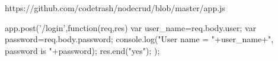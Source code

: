 https://github.com/codetrash/nodecrud/blob/master/app.js

app.post('/login',function(req,res){
  var user_name=req.body.user;
  var password=req.body.password;
  console.log("User name = "+user_name+", password is "+password);
  res.end("yes");
});